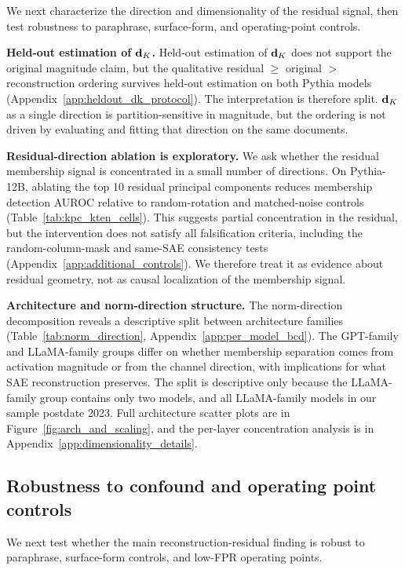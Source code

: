 We next characterize the direction and dimensionality of the residual signal, then test robustness to paraphrase, surface-form, and operating-point controls.

\textbf{Held-out estimation of $\mathbf{d}_K$.}
Held-out estimation of $\mathbf{d}_K$ does not support the original magnitude claim, but the qualitative residual $\geq$ original $>$ reconstruction ordering survives held-out estimation on both Pythia models (Appendix~\ref{app:heldout_dk_protocol}). The interpretation is therefore split. $\mathbf{d}_K$ as a single direction is partition-sensitive in magnitude, but the ordering is not driven by evaluating and fitting that direction on the same documents.

\textbf{Residual-direction ablation is exploratory.}
We ask whether the residual membership signal is concentrated in a small number of directions. On Pythia-12B, ablating the top 10 residual principal
components reduces membership detection AUROC relative to random-rotation and matched-noise controls (Table~\ref{tab:kpc_kten_cells}). This suggests
partial concentration in the residual, but the intervention does not satisfy all falsification criteria, including the random-column-mask and same-SAE
consistency tests (Appendix~\ref{app:additional_controls}). We therefore treat it as evidence about residual geometry, not as causal localization of the
membership signal.

\textbf{Architecture and norm-direction structure.}
The norm-direction decomposition reveals a descriptive split between architecture families (Table~\ref{tab:norm_direction}, Appendix~\ref{app:per_model_bcd}). The GPT-family and LLaMA-family groups differ on whether membership separation comes from activation magnitude or from the channel direction, with implications for what SAE reconstruction preserves. The split is descriptive only because the LLaMA-family group contains only two models, and all LLaMA-family models in our sample postdate 2023. Full architecture scatter plots are in Figure~\ref{fig:arch_and_scaling}, and the per-layer concentration analysis is in Appendix~\ref{app:dimensionality_details}.

\subsection{Robustness to confound and operating point controls}
\label{sec:results:robustness}

We next test whether the main reconstruction-residual finding is robust to paraphrase, surface-form controls, and low-FPR operating points.

